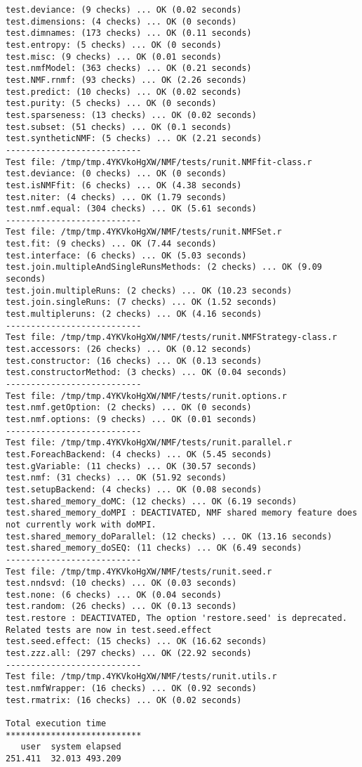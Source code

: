 \documentclass[10pt]{article}
\begin{document}
\begin{verbatim}
test.deviance: (9 checks) ... OK (0.02 seconds)
test.dimensions: (4 checks) ... OK (0 seconds)
test.dimnames: (173 checks) ... OK (0.11 seconds)
test.entropy: (5 checks) ... OK (0 seconds)
test.misc: (9 checks) ... OK (0.01 seconds)
test.nmfModel: (363 checks) ... OK (0.21 seconds)
test.NMF.rnmf: (93 checks) ... OK (2.26 seconds)
test.predict: (10 checks) ... OK (0.02 seconds)
test.purity: (5 checks) ... OK (0 seconds)
test.sparseness: (13 checks) ... OK (0.02 seconds)
test.subset: (51 checks) ... OK (0.1 seconds)
test.syntheticNMF: (5 checks) ... OK (2.21 seconds)
--------------------------- 
Test file: /tmp/tmp.4YKVkoHgXW/NMF/tests/runit.NMFfit-class.r 
test.deviance: (0 checks) ... OK (0 seconds)
test.isNMFfit: (6 checks) ... OK (4.38 seconds)
test.niter: (4 checks) ... OK (1.79 seconds)
test.nmf.equal: (304 checks) ... OK (5.61 seconds)
--------------------------- 
Test file: /tmp/tmp.4YKVkoHgXW/NMF/tests/runit.NMFSet.r 
test.fit: (9 checks) ... OK (7.44 seconds)
test.interface: (6 checks) ... OK (5.03 seconds)
test.join.multipleAndSingleRunsMethods: (2 checks) ... OK (9.09 seconds)
test.join.multipleRuns: (2 checks) ... OK (10.23 seconds)
test.join.singleRuns: (7 checks) ... OK (1.52 seconds)
test.multipleruns: (2 checks) ... OK (4.16 seconds)
--------------------------- 
Test file: /tmp/tmp.4YKVkoHgXW/NMF/tests/runit.NMFStrategy-class.r 
test.accessors: (26 checks) ... OK (0.12 seconds)
test.constructor: (16 checks) ... OK (0.13 seconds)
test.constructorMethod: (3 checks) ... OK (0.04 seconds)
--------------------------- 
Test file: /tmp/tmp.4YKVkoHgXW/NMF/tests/runit.options.r 
test.nmf.getOption: (2 checks) ... OK (0 seconds)
test.nmf.options: (9 checks) ... OK (0.01 seconds)
--------------------------- 
Test file: /tmp/tmp.4YKVkoHgXW/NMF/tests/runit.parallel.r 
test.ForeachBackend: (4 checks) ... OK (5.45 seconds)
test.gVariable: (11 checks) ... OK (30.57 seconds)
test.nmf: (31 checks) ... OK (51.92 seconds)
test.setupBackend: (4 checks) ... OK (0.08 seconds)
test.shared_memory_doMC: (12 checks) ... OK (6.19 seconds)
test.shared_memory_doMPI : DEACTIVATED, NMF shared memory feature does not currently work with doMPI.
test.shared_memory_doParallel: (12 checks) ... OK (13.16 seconds)
test.shared_memory_doSEQ: (11 checks) ... OK (6.49 seconds)
--------------------------- 
Test file: /tmp/tmp.4YKVkoHgXW/NMF/tests/runit.seed.r 
test.nndsvd: (10 checks) ... OK (0.03 seconds)
test.none: (6 checks) ... OK (0.04 seconds)
test.random: (26 checks) ... OK (0.13 seconds)
test.restore : DEACTIVATED, The option 'restore.seed' is deprecated. Related tests are now in test.seed.effect
test.seed.effect: (15 checks) ... OK (16.62 seconds)
test.zzz.all: (297 checks) ... OK (22.92 seconds)
--------------------------- 
Test file: /tmp/tmp.4YKVkoHgXW/NMF/tests/runit.utils.r 
test.nmfWrapper: (16 checks) ... OK (0.92 seconds)
test.rmatrix: (16 checks) ... OK (0.02 seconds)

Total execution time
***************************
   user  system elapsed 
251.411  32.013 493.209 

\end{verbatim}
\end{document}
